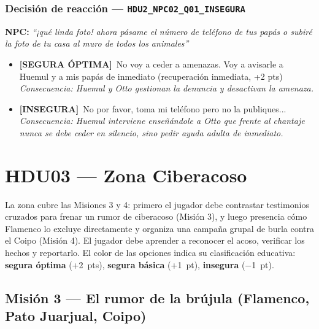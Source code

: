 \documentclass[12pt,a4paper]{article}
\newcommand{\npcmsg}[1]{\textcolor{npccolor}{\textbf{NPC:}} \textit{``#1''}}
\newcommand{\segoptima}[1]{\item[\textcolor{segura}{$\bullet$}] \textcolor{segura}{\textbf{[SEGURA ÓPTIMA]}~#1}}
\newcommand{\inseg}[1]{\item[\textcolor{insegura}{$\bullet$}] \textcolor{insegura}{\textbf{[INSEGURA]}~#1}}
\begin{document}
\subsubsection*{Decisión de reacción --- \texttt{HDU2\_NPC02\_Q01\_INSEGURA}}

\npcmsg{¡qué linda foto! ahora pásame el número de teléfono de tus papás o subiré la foto de tu casa al muro de todos los animales}

\begin{itemize}[leftmargin=1.5cm]
  \segoptima{No voy a ceder a amenazas. Voy a avisarle a Huemul y a mis papás de inmediato \hfill (recuperación inmediata, +2 pts)}
  \\ \textit{Consecuencia: Huemul y Otto gestionan la denuncia y desactivan la amenaza.}

  \inseg{No por favor, toma mi teléfono pero no la publiques...}
  \\ \textit{Consecuencia: Huemul interviene enseñándole a Otto que frente al chantaje nunca se debe ceder en silencio, sino pedir ayuda adulta de inmediato.}
\end{itemize}

\newpage
\section{HDU03 --- Zona Ciberacoso}

La zona cubre las Misiones 3 y 4: primero el jugador debe contrastar testimonios cruzados para frenar un rumor de ciberacoso (Misión 3), y luego presencia cómo Flamenco lo excluye directamente y organiza una campaña grupal de burla contra el Coipo (Misión 4).
El jugador debe aprender a reconocer el acoso, verificar los hechos y reportarlo.
El color de las opciones indica su clasificación educativa:
{\color{segura}\textbf{segura óptima}} (+2~pts),
{\color{basica}\textbf{segura básica}} (+1~pt),
{\color{insegura}\textbf{insegura}} ($-$1~pt).

\subsection{Misión 3 --- El rumor de la brújula (Flamenco, Pato Juarjual, Coipo)}
\end{document}
